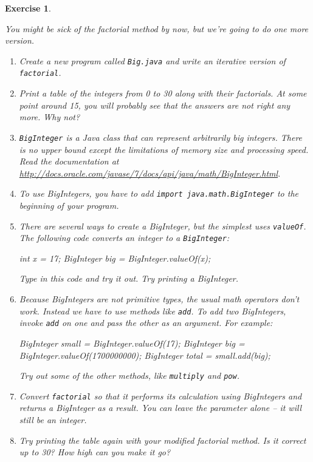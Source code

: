 \documentclass[12pt]{book}
\theoremstyle{exercise}
\newtheorem{exercise}{Exercise}[chapter]
\newcommand{\java}[1]{\verb"#1"}
\newcommand{\java}[1]{\lstinline{#1}} %
\begin{document}
\begin{exercise}
\label{ex.biginteger}

You might be sick of the factorial method by now, but we're going to do one more version.

\begin{enumerate}

\item Create a new program called \java{Big.java} and write an iterative version of \java{factorial}.

\item Print a table of the integers from 0 to 30 along with their factorials.
At some point around 15, you will probably see that the answers are not right any more.
Why not?

\item \java{BigInteger} is a Java class that can represent arbitrarily big integers.
There is no upper bound except the limitations of memory size and processing speed.
Read the documentation at \url{http://docs.oracle.com/javase/7/docs/api/java/math/BigInteger.html}.

\item To use BigIntegers, you have to add \java{import java.math.BigInteger} to the beginning of your program.

\item There are several ways to create a BigInteger, but the simplest uses \java{valueOf}.
The following code converts an integer to a \java{BigInteger}:

\begin{code}
    int x = 17;
    BigInteger big = BigInteger.valueOf(x);
\end{code}

Type in this code and try it out.
Try printing a BigInteger.

\item Because BigIntegers are not primitive types, the usual math operators don't work.
Instead we have to use methods like \java{add}.
To add two BigIntegers, invoke \java{add} on one and pass the other as an argument.
For example:

\begin{code}
    BigInteger small = BigInteger.valueOf(17);
    BigInteger big = BigInteger.valueOf(1700000000);
    BigInteger total = small.add(big);
\end{code}

Try out some of the other methods, like \java{multiply} and \java{pow}.

\item Convert \java{factorial} so that it performs its calculation using BigIntegers and returns a BigInteger as a result.
You can leave the parameter alone -- it will still be an integer.

\item Try printing the table again with your modified factorial method.
Is it correct up to 30?
How high can you make it go?

\end{enumerate}
\end{exercise}
\end{document}
